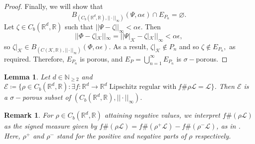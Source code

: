 \documentclass{article}
\newtheorem{lemma}[define]{Lemma}
\newtheorem*{remark*}{Remark}
\newcommand{\R}{\mathbb{R}}
\newcommand{\N}{\mathbb{N}}
\newcommand{\leb}{\mc{L}}
\newcommand{\mc}[1]{\mathcal{#1}}
\begin{document}
\begin{proof}
    Finally, we will show that $$B_{(C_b(\R^d,\R),||\cdot||_\infty)}(\Psi, \alpha \epsilon) \cap E_{P_n} = \varnothing.$$ Let $\zeta \in C_b(\R^d,\R)$ such that $||\Psi-\zeta||_\infty < \alpha\epsilon.$ Then $$||\Phi-\zeta|_{\mathcal{K}}||_\infty =||\Psi|_{\mathcal{K}}-\zeta|_{\mathcal{K}}||_\infty < \alpha\epsilon,$$ so $\zeta|_\mathcal{K} \in B_{(C(\mathcal{K},\R),||\cdot||_\infty)}(\Phi, \alpha \epsilon).$ As a result, $\zeta|_\mathcal{K} \notin P_n$ and so $\zeta \notin E_{P_n},$ as required. Therefore, $E_{P_n}$ is porous, and $E_P = \bigcup_{n=1}^\infty E_{P_n}$ is $\sigma-$porous.
    \end{proof}
    
\begin{lemma} \label{lemma: porosity e}
    Let $d \in \N_{\geq 2}$ and $\mathcal{E} \coloneqq \{\rho \in C_b(\R^d,\R): \exists f:\R^d \to \R^d \;\text{Lipschitz regular with}\; f\#\rho\leb =\leb\}$. Then $\mathcal{E}$ is a $\sigma-$porous subset of $(C_b(\R^d,\R),||\cdot||_{\infty}).$
\end{lemma}
\begin{remark*}
    For $\rho\in C_{b}(\R^{d},\R)$ attaining negative values, we interpret $f\#(\rho\leb)$ as the signed measure given by $f\#(\rho\leb)=f\#(\rho^{+}\leb)-f\#( \rho^{-}\leb)$, as in \cite{dymond2018mapping}. Here, $\rho^{+}$ and $\rho^{-}$ stand for the positive and negative parts of $\rho$ respectively.
\end{remark*}
\end{document}

